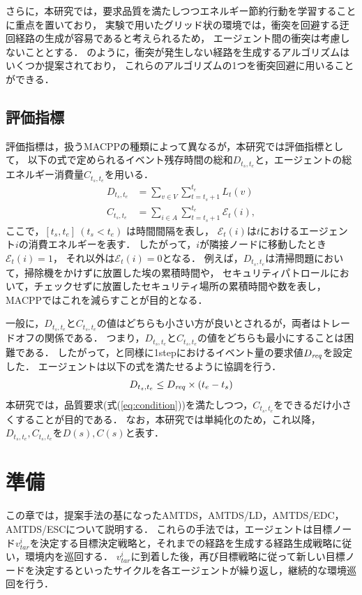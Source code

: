 \documentclass[12pt,a4j,twoside]{jarticle}
\def\AgentSet{A}
\def\Dreq{{D_{\it req}}}
\def\En{\mathcal{E}}
\begin{document}
さらに，本研究では，要求品質を満たしつつエネルギー節約行動を学習することに重点を置いており，
実験で用いたグリッド状の環境では，衝突を回避する迂回経路の生成が容易であると考えられるため，
エージェント間の衝突は考慮しないこととする．
\cite{Yamauchi2022,Satish2017}のように，衝突が発生しない経路を生成するアルゴリズムはいくつか提案されており，
これらのアルゴリズムの1つを衝突回避に用いることができる．

\subsection{評価指標}
評価指標は，扱うMACPPの種類によって異なるが，本研究では評価指標として，
以下の式で定められるイベント残存時間の総和$D_{t_s,t_e}$と，エージェントの総エネルギー消費量$C_{t_s,t_e}$を用いる．
%
\begin{align}
  D_{t_s,t_e} &= \sum_{v \in V} \sum^{t_e}_{t=t_s+1} L_t(v)\\
  C_{t_s,t_e} &= \sum_{i \in \AgentSet} \sum^{t_e}_{t=t_s+1} \En_t(i),
\end{align}
%
ここで，$[t_s,t_e]~(t_s < t_e)$ は時間間隔を表し，
$\En_t(i)$は$t$におけるエージェント$i$の消費エネルギーを表す．
したがって，$i$が隣接ノードに移動したとき$\En_t(i)=1$，
それ以外は$\En_t(i)=0$となる．
例えば，$D_{t_s,t_e}$は清掃問題において，掃除機をかけずに放置した埃の累積時間や，
セキュリティパトロールにおいて，チェックせずに放置したセキュリティ場所の累積時間や数を表し，
MACPPではこれを減らすことが目的となる．
\par
一般に，$D_{t_s,t_e}$と$C_{t_s,t_e}$の値はどちらも小さい方が良いとされるが，両者はトレードオフの関係である．
つまり，$D_{t_s,t_e}$と$C_{t_s,t_e}$の値をどちらも最小にすることは困難である．
したがって，\cite{Wu2019}と同様に1stepにおけるイベント量の要求値$\Dreq$を設定した．
エージェントは以下の式を満たせるように協調を行う．
%
\begin{equation}\label{eq:condition}
  D_{t_s,t_e}\leq \Dreq \times (t_e - t_s)
\end{equation}
%
本研究では，品質要求(式(\ref{eq:condition}))を満たしつつ，$C_{t_s, t_e}$をできるだけ小さくすることが目的である．
なお，本研究では単純化のため，これ以降，$D_{t_s,t_e}, C_{t_s,t_e}$を$D(s), C(s)$と表す．

\section{準備}
この章では，提案手法の基になったAMTDS，AMTDS/LD，AMTDS/EDC，AMTDS/ESCについて説明する．
これらの手法では，エージェントは目標ノード$v^i_{tar}$を決定する目標決定戦略と，それまでの経路を生成する経路生成戦略に従い，環境内を巡回する．
$v^i_{tar}$に到着した後，再び目標戦略に従って新しい目標ノードを決定するといったサイクルを各エージェントが繰り返し，継続的な環境巡回を行う．
\end{document}
